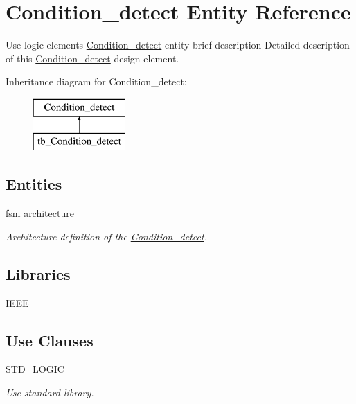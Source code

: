 \hypertarget{class_condition__detect}{}\section{Condition\+\_\+detect Entity Reference}
\label{class_condition__detect}


Use logic elements \hyperlink{class_condition__detect}{Condition\+\_\+detect} entity brief description Detailed description of this \hyperlink{class_condition__detect}{Condition\+\_\+detect} design element.  


Inheritance diagram for Condition\+\_\+detect\+:\begin{figure}[H]
\begin{center}
\leavevmode
\includegraphics[height=2.000000cm]{class_condition__detect}
\end{center}
\end{figure}
\subsection*{Entities}
\begin{DoxyCompactItemize}
\item 
\hyperlink{class_condition__detect_1_1fsm}{fsm} architecture
\begin{DoxyCompactList}\small\item\em Architecture definition of the \hyperlink{class_condition__detect}{Condition\+\_\+detect}. \end{DoxyCompactList}\end{DoxyCompactItemize}
\subsection*{Libraries}
 \begin{DoxyCompactItemize}
\item 
\hyperlink{class_condition__detect_ae4f03c286607f3181e16b9aa12d0c6d4}{I\+E\+EE} 
\end{DoxyCompactItemize}
\subsection*{Use Clauses}
 \begin{DoxyCompactItemize}
\item 
\hyperlink{class_condition__detect_aa4b2b25246a821511120e3149b003563}{S\+T\+D\+\_\+\+L\+O\+G\+I\+C\+\_}   \hypertarget{class_condition__detect_aa4b2b25246a821511120e3149b003563}{}\label{class_condition__detect_aa4b2b25246a821511120e3149b003563}

\begin{DoxyCompactList}\small\item\em Use standard library. \end{DoxyCompactList}\end{DoxyCompactItemize}
